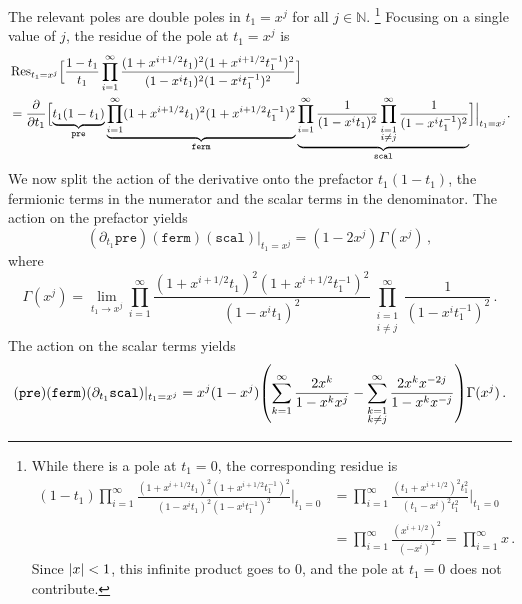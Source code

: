 \documentclass[a4paper,11pt]{article}
\begin{document}
The relevant poles are double poles in $t_1 = x^j$ for all $j\in \mathbb{N}$.%
\footnote{%
While there is a pole at $t_1=0$, the corresponding residue is
\begin{equation}
\begin{split}
	(1-t_1) \prod_{i=1}^\infty \frac{(1+x^{i+1/2}t_1)^2(1+x^{i+1/2}t_1^{-1})^2}{(1-x^{i}t_1)^2(1-x^{i}t_1^{-1})^2}\Big|_{t_1=0}
	&=  \prod_{i=1}^\infty \frac{(t_1+x^{i+1/2})^2 t_1^2}{(t_1-x^{i})^2 t_1^2}\Big|_{t_1=0}\\
	&
	= \prod_{i=1}^\infty \frac{(x^{i+1/2})^2}{(-x^{i})^2}= \prod_{i=1}^\infty x\,.
\end{split}
\end{equation}
Since $\abs{x}<1$, this infinite product goes to $0$, and the pole at $t_1=0$ does not contribute.}
Focusing on a single value of $j$, the residue of the pole at $t_1 = x^j$ is
\begin{equation}
\begin{split}
	&\Res_{t_1=x^j}\Bigl[\frac{1-t_1}{t_1} \prod_{i=1}^\infty \frac{(1+x^{i+1/2}t_1)^2(1+x^{i+1/2}t_1^{-1})^2}{(1-x^{i}t_1)^2(1-x^{i}t_1^{-1})^2}\Bigr]\\
	&= \pdv{t_1}\Bigl[\underbrace{t_1(1-t_1)}_{\mathtt{pre}} \underbrace{\prod_{i=1}^\infty(1+x^{i+1/2}t_1)^2(1+x^{i+1/2}t_1^{-1})^2}_{\mathtt{ferm}} \underbrace{\prod_{i=1}^\infty\frac{1}{(1-x^{i}t_1)^2} \prod_{\substack{i=1\\i\neq j}}^\infty \frac{1}{(1-x^{i}t_1^{-1})^2}}_{\mathtt{scal}}\Bigr]\Big|_{t_1=x^j}.
\end{split}
\end{equation}
We now split the action of the derivative onto the prefactor $t_1(1-t_1)$, the fermionic terms in the numerator and the scalar terms in the denominator. The action on the prefactor yields
\begin{equation}
	(\partial_{t_1}\mathtt{pre})(\mathtt{ferm})(\mathtt{scal})|_{t_1=x^j}=(1-2x^j) \Gamma(x^j)\,,
\end{equation}
where 
\begin{equation}
	\Gamma(x^j) = \lim_{t_1\to x^j}  \prod_{i=1}^\infty \frac{(1+x^{i+1/2}t_1)^2(1+x^{i+1/2}t_1^{-1})^2}{(1-x^{i}t_1)^2} \prod_{\substack{i=1\\i\neq j}}^\infty \frac{1}{(1-x^{i}t_1^{-1})^2}\,.
\end{equation}
The action on the scalar terms yields
\begin{equation}
	(\mathtt{pre})(\mathtt{ferm})(\partial_{t_1}\mathtt{scal})|_{t_1=x^j}=x^j(1-x^j) \qty(\sum_{k=1}^\infty \frac{2x^k}{1-x^kx^j} - \sum_{\substack{k=1\\k\neq j}}^\infty \frac{2x^kx^{-2j}}{1-x^kx^{-j}}) \Gamma(x^j)\,.
\end{equation}
\end{document}
